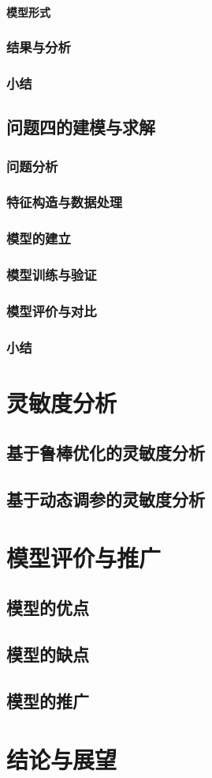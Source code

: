 \documentclass[withoutpreface]{cumcmthesis}
\begin{document}
\paragraph{模型形式}
\subsubsection{结果与分析}
\subsubsection{小结}

\subsection{问题四的建模与求解}
\subsubsection{问题分析}
\subsubsection{特征构造与数据处理}
\subsubsection{模型的建立}
\subsubsection{模型训练与验证}
\subsubsection{模型评价与对比}
\subsubsection{小结}

\section{灵敏度分析}
\subsection{基于鲁棒优化的灵敏度分析}
\subsection{基于动态调参的灵敏度分析}

\section{模型评价与推广}
\subsection{模型的优点}
\subsection{模型的缺点}
\subsection{模型的推广}

\section{结论与展望}



\end{document}
